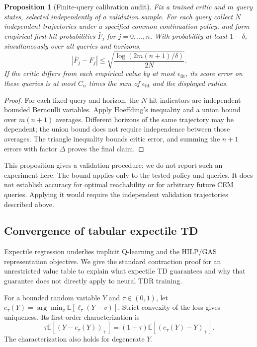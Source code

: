 \documentclass{article}
\newcommand{\EE}{\mathbb E}
\newtheorem{proposition}[theorem]{Proposition}
\theoremstyle{definition}
\theoremstyle{remark}
\begin{document}
\begin{proposition}[Finite-query calibration audit]
\label{prop:finite-audit}
Fix a trained critic and $m$ query states, selected independently of a validation
sample. For each query collect $N$ independent trajectories under a specified common
continuation policy, and form empirical first-hit probabilities $\bar F_j$ for
$j=0,\ldots,n$. With probability at least $1-\delta$, simultaneously over all queries
and horizons,
\[
 |\bar F_j-F_j|\le
 \sqrt{\frac{\log(2m(n+1)/\delta)}{2N}}.
\]
If the critic differs from each empirical value by at most $\epsilon_{\mathrm{fit}}$,
its score error on these queries is at most $C_n$ times the sum of
$\epsilon_{\mathrm{fit}}$ and the displayed radius.
\end{proposition}
\begin{proof}
For each fixed query and horizon, the $N$ hit indicators are independent bounded
Bernoulli variables. Apply Hoeffding's inequality \citep{hoeffding1963} and a union
bound over $m(n+1)$ averages. Different horizons of the same trajectory may be
dependent; the union bound does not require independence between those averages.
The triangle inequality bounds critic error, and summing the $n+1$ errors with
factor $\Delta$ proves the final claim.
\end{proof}
This proposition gives a validation procedure; we do not report such an experiment here.
The bound applies only to the tested policy and queries. It does not establish accuracy
for optimal reachability or for arbitrary future CEM queries.
Applying it would require the independent validation trajectories described above.

\subsection{Convergence of tabular expectile TD}
\label{app:expectile}
Expectile regression \citep{newey1987} underlies implicit Q-learning
\citep{iql} and the HILP/GAS representation objective.
We give the standard contraction proof for an unrestricted value table to explain
what expectile TD guarantees and why that guarantee does not directly apply to neural TDR training.

For a bounded random variable $Y$ and $\tau\in(0,1)$, let
$e_\tau(Y)=\arg\min_v\EE[\ell_\tau(Y-v)]$.
Strict convexity of the loss gives uniqueness.
Its first-order characterization is
\begin{equation}
 \tau\EE[(Y-e_\tau(Y))_+]
   =(1-\tau)\EE[(e_\tau(Y)-Y)_+].
 \label{eq:expectile-balance}
\end{equation}
The characterization also holds for degenerate $Y$.
\end{document}
